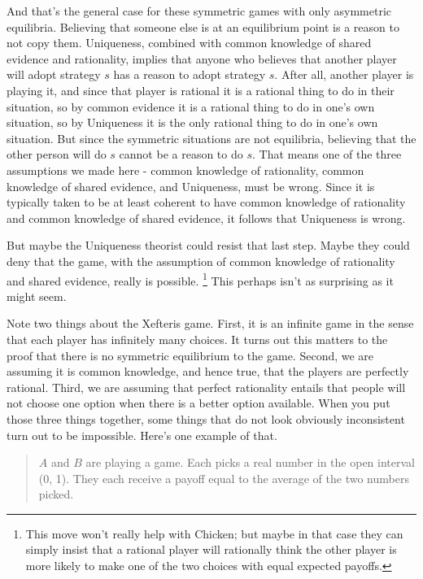 \documentclass[
  11pt,
]{article}
\begin{document}
And that's the general case for these symmetric games with only asymmetric equilibria. Believing that someone else is at an equilibrium point is a reason to not copy them. Uniqueness, combined with common knowledge of shared evidence and rationality, implies that anyone who believes that another player will adopt strategy \(s\) has a reason to adopt strategy \(s\). After all, another player is playing it, and since that player is rational it is a rational thing to do in their situation, so by common evidence it is a rational thing to do in one's own situation, so by Uniqueness it is the only rational thing to do in one's own situation. But since the symmetric situations are not equilibria, believing that the other person will do \(s\) cannot be a reason to do \(s\). That means one of the three assumptions we made here - common knowledge of rationality, common knowledge of shared evidence, and Uniqueness, must be wrong. Since it is typically taken to be at least coherent to have common knowledge of rationality and common knowledge of shared evidence, it follows that Uniqueness is wrong.

But maybe the Uniqueness theorist could resist that last step. Maybe they could deny that the game, with the assumption of common knowledge of rationality and shared evidence, really is possible. \footnote{This move won't really help with Chicken; but maybe in that case they can simply insist that a rational player will rationally think the other player is more likely to make one of the two choices with equal expected payoffs.} This perhaps isn't as surprising as it might seem.

Note two things about the Xefteris game. First, it is an infinite game in the sense that each player has infinitely many choices. It turns out this matters to the proof that there is no symmetric equilibrium to the game. Second, we are assuming it is common knowledge, and hence true, that the players are perfectly rational. Third, we are assuming that perfect rationality entails that people will not choose one option when there is a better option available. When you put those three things together, some things that do not look obviously inconsistent turn out to be impossible. Here's one example of that.

\begin{quote}
\(A\) and \(B\) are playing a game. Each picks a real number in the open interval (0, 1). They each receive a payoff equal to the average of the two numbers picked.
\end{quote}
\end{document}
